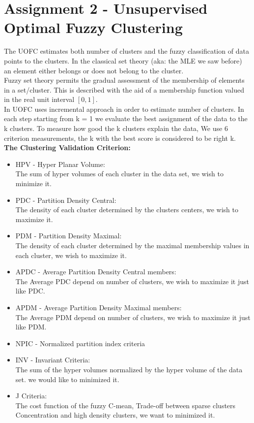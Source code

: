 \documentclass[12pt, a4paper]{paper}
\begin{document}
\section*{Assignment 2 - Unsupervised Optimal Fuzzy Clustering}

The UOFC \citep{UOFC} estimates both number of clusters and the fuzzy classification of data points to the clusters. In the classical set theory (aka: the MLE we saw before) an element either belongs or does not belong to the cluster. \\ Fuzzy set theory permits the gradual assessment of the membership of elements in a set/cluster. This is described with the aid of a membership function valued in the real unit interval $[0,1]$. \\ 
In UOFC uses incremental approach in order to estimate number of clusters. In each step starting from k = 1 we evaluate the best assignment of the data to the k clusters. To measure how good the k clusters explain the data, We use 6 criterion measurements, the k with the best score is considered to be right k. \\
\textbf{The Clustering Validation Criterion:}
\begin{itemize}
    \item HPV - Hyper Planar Volume: \\ The sum of hyper volumes of each cluster in the data set, we wish to minimize it. 
    \item PDC - Partition Density Central: \\ The density of each cluster determined by the clusters centers, we wish to maximize it.
    \item PDM - Partition Density Maximal: \\ The density of each cluster determined by the maximal membership values in each cluster, we wish to maximize it.
    \item APDC - Average Partition Density Central members: \\ The Average PDC depend on number of clusters, we wish to maximize it just like PDC. 
    \item APDM - Average Partition Density Maximal members: \\ The Average PDM depend on number of clusters, we wish to maximize it just like PDM. 
    \item NPIC - Normalized partition index criteria 
    \item INV - Invariant Criteria: \\ The sum of the hyper volumes normalized by the hyper volume of the data set. we would like to minimized it.
    \item J Criteria: \\ The cost function of the fuzzy C-mean, Trade-off between sparse clusters Concentration and high density clusters, we want to minimized it. 
\end{itemize}
\end{document}
